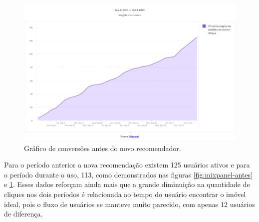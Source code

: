 \begin{figure}[H]
    \centering
    \includegraphics[scale=0.35]{figuras/desenvolvimento/mixpanel-depois.png}
    \caption[Gráfico de conversões antes do novo recomendador]{Gráfico de conversões antes do novo recomendador.}
    \label{fig:mixpanel-depois}
\end{figure}

Para o período anterior a nova recomendação existem 125 usuários ativos e para o período durante o uso, 113, como demonstrados nas figuras \ref{fig:mixpanel-antes} e \ref{fig:mixpanel-depois}. Esses dados reforçam ainda mais que a grande diminuição na quantidade de cliques nos dois períodos é relacionada ao tempo do usuário encontrar o imóvel ideal, pois o fluxo de usuários se manteve muito parecido, com apenas 12 usuários de diferença.














